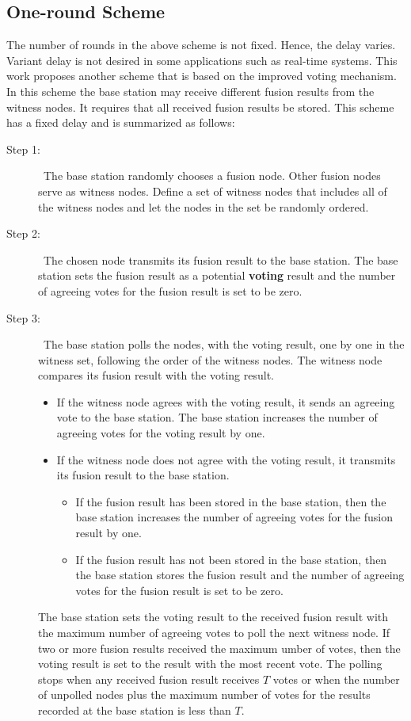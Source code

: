 \documentclass[12pt, onecolumn, draftcls]{IEEEtran}
\begin{document}
\subsection{One-round Scheme} The number of rounds in the above scheme is not
fixed. Hence, the delay varies. Variant delay is not desired in some
applications such as real-time systems. This work proposes another
scheme that is based on the improved voting mechanism. In this
scheme the base station may receive different fusion results from
the witness nodes. It requires that all received fusion results be
stored. This scheme has a fixed delay and is summarized  as follows:
\begin{description}
\item[Step 1: ]\ The base station randomly chooses a fusion node.
Other fusion nodes serve as witness nodes. Define a set of witness
nodes that includes all of the witness nodes and let the nodes in
the set be randomly ordered.

\item[Step 2: ]\ The chosen node transmits its fusion result to
the base station. The base station sets the fusion result as a
potential {\bf voting} result and the number of agreeing votes for
the fusion result is set to be zero.

\item[Step 3: ]\ The base station polls the nodes, with the voting
result, one by one in the witness set, following the order of the
witness nodes. The witness node compares its fusion result with the
voting result.
\begin{itemize}
 \item If the witness node agrees with the voting result, it sends
an agreeing vote to the base station. The base station increases the
number of agreeing votes for the voting result by one.
 \item If the witness node does not agree with the voting result,
it transmits its fusion result to the base station.
  \begin{itemize}
   \item If the fusion result has been stored in the base station, then the
    base station increases the number of agreeing votes for the fusion result
    by one.
   \item If the fusion result has not been stored in the base station,
    then the base station stores the fusion result and the number of agreeing
    votes for the fusion result is set to be zero.
  \end{itemize}
\end{itemize}
The base station sets the voting result to the received fusion
result with the maximum number of agreeing votes to poll the next
witness node. If two or more fusion results received the maximum
umber of votes, then the voting result is set to the result with the
most recent vote. The polling stops when any received fusion result
receives $T$ votes or when the number of unpolled nodes plus the
maximum number of votes for the results recorded at the base station
is less than $T$.
\end{description}
\end{document}
